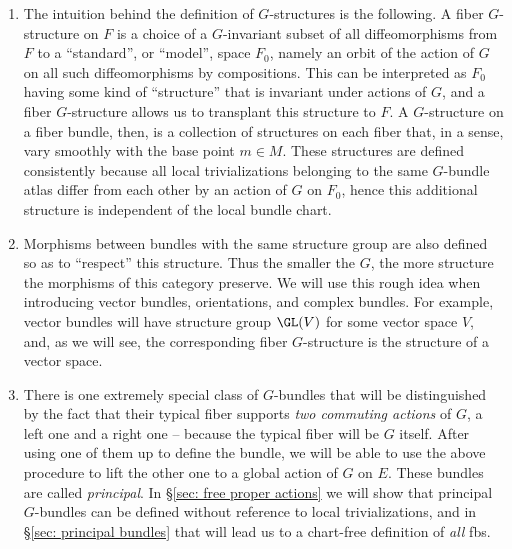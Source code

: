 \begin{rem}
    \begin{enumerate}
        \item The intuition behind the definition of $G$-structures is the following. A fiber $G$-structure on $F$ is a choice of a $G$-invariant subset of all diffeomorphisms from $F$ to a ``standard'', or ``model'', space $F_0$, namely an orbit of the action of $G$ on all such diffeomorphisms by compositions. This can be interpreted as $F_0$ having some kind of ``structure'' that is invariant under actions of $G$, and a fiber $G$-structure allows us to transplant this structure to $F$. A $G$-structure on a fiber bundle, then, is a collection of structures on each fiber that, in a sense, vary smoothly with the base point $m\in M$. These structures are defined consistently because all local trivializations belonging to the same $G$-bundle atlas differ from each other by an action of $G$ on $F_0$, hence this additional structure is independent of the local bundle chart. 
        \item Morphisms between bundles with the same structure group are also defined so as to ``respect'' this structure. Thus the smaller the $G$, the more structure the morphisms of this category preserve. We will use this rough idea when introducing vector bundles, orientations, and complex bundles. For example, vector bundles will have structure group $\GL(V)$ for some vector space $V$, and, as we will see, the corresponding fiber $G$-structure is the structure of a vector space.
        
        \item There is one extremely special class of $G$-bundles that will be distinguished by the fact that their typical fiber supports \emph{two commuting actions} of $G$, a left one and a right one -- because the typical fiber will be $G$ itself. After using one of them up to define the bundle, we will be able to use the above procedure to lift the other one to a global action of $G$ on $E$. These bundles are called \emph{principal}. In \S\ref{sec: free proper actions} we will show that principal $G$-bundles can be defined without reference to local trivializations, and in \S\ref{sec: principal bundles} that will lead us to a chart-free definition of \emph{all} \glspl{fb}.
    \end{enumerate}
\end{rem}
